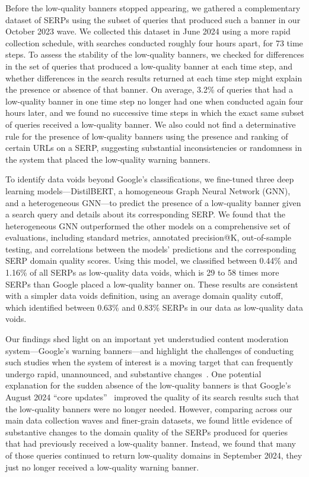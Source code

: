 Before the low-quality banners stopped appearing, we gathered a complementary dataset of SERPs using the subset of queries that produced such a banner in our October 2023 wave.
We collected this dataset in June 2024 using a more rapid collection schedule, with searches conducted roughly four hours apart, for 73 time steps.
To assess the stability of the low-quality banners, we checked for differences in the set of queries that produced a low-quality banner at each time step, and whether differences in the search results returned at each time step might explain the presence or absence of that banner.
On average, 3.2\% of queries that had a low-quality banner in one time step no longer had one when conducted again four hours later, and we found no successive time steps in which the exact same subset of queries received a low-quality banner.
We also could not find a determinative rule for the presence of low-quality banners using the presence and ranking of certain URLs on a SERP, suggesting substantial inconsistencies or randomness in the system that placed the low-quality warning banners.

To identify data voids beyond Google's classifications, we fine-tuned three deep learning models---DistilBERT, a homogeneous Graph Neural Network (GNN), and a heterogeneous GNN---to predict the presence of a low-quality banner given a search query and details about its corresponding SERP. 
We found that the heterogeneous GNN outperformed the other models on a comprehensive set of evaluations, including standard metrics, annotated precision@K, out-of-sample testing, and correlations between the models' predictions and the corresponding SERP domain quality scores.
Using this model, we classified between 0.44\% and 1.16\% of all SERPs as low-quality data voids, which is 29 to 58 times more SERPs than Google placed a low-quality banner on.
These results are consistent with a simpler data voids definition, using an average domain quality cutoff, which identified between 0.63\% and 0.83\% SERPs in our data as low-quality data voids.

Our findings shed light on an important yet understudied content moderation system---Google's warning banners---and highlight the challenges of conducting such studies when the system of interest is a moving target that can frequently undergo rapid, unannounced, and substantive changes~\citep{bagchi2024social}.
One potential explanation for the sudden absence of the low-quality banners is that Google's August 2024 ``core updates''~\citep{aug2024update} improved the quality of its search results such that the low-quality banners were no longer needed.
However, comparing across our main data collection waves and finer-grain datasets, we found little evidence of substantive changes to the domain quality of the SERPs produced for queries that had previously received a low-quality banner.
Instead, we found that many of those queries continued to return low-quality domains in September 2024, they just no longer received a low-quality warning banner.

